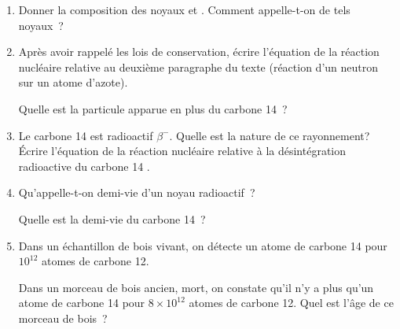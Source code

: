 \begin{enumerate}
    \item Donner la composition des noyaux  et .
          Comment appelle-t-on de tels noyaux~?
    \item Après avoir rappelé les lois de conservation, écrire l'équation de la
          réaction nucléaire relative au deuxième paragraphe du texte (réaction
          d'un neutron sur un atome d'azote).

          Quelle est la particule apparue en plus du carbone 14~?
    \item Le carbone 14 est radioactif $\beta^{-}$. Quelle est la nature de ce
          rayonnement? Écrire l'équation de la réaction nucléaire relative à la
          désintégration radioactive du carbone 14 .
    \item Qu'appelle-t-on demi-vie d'un noyau radioactif~?

          Quelle est la demi-vie du carbone 14~?
    \item Dans un échantillon de bois vivant, on détecte un atome de carbone 14
          pour $10^{12}$ atomes de carbone 12.
    
          Dans un morceau de bois ancien, mort, on constate qu'il n'y a plus
          qu'un atome de carbone 14 pour $8 \times 10^{12}$ atomes de carbone
          12. Quel est l'âge de ce morceau de bois~?
\end{enumerate}


